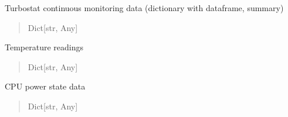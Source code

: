 \documentclass[letterpaper,10pt,english]{sphinxmanual}
\begin{document}
\begin{fulllineitems}
\begin{fulllineitems}
\begin{quote}
\begin{description}
\end{description}\end{quote}

\end{fulllineitems}


\begin{fulllineitems}
\label{\detokenize{core.models.raw_energy_measurement:core.models.raw_energy_measurement.RawEnergyMeasurement.turbostat}}
\pysigstartsignatures
\pysigline
{}
\pysigstopsignatures
\sphinxAtStartPar
Turbostat continuous monitoring data (dictionary with dataframe, summary)
\begin{quote}\begin{description}
\sphinxAtStartPar
Dict{[}str, Any{]}

\end{description}\end{quote}

\end{fulllineitems}


\begin{fulllineitems}
\label{\detokenize{core.models.raw_energy_measurement:core.models.raw_energy_measurement.RawEnergyMeasurement.thermal}}
\pysigstartsignatures
\pysigline
{}
\pysigstopsignatures
\sphinxAtStartPar
Temperature readings
\begin{quote}\begin{description}
\sphinxAtStartPar
Dict{[}str, Any{]}

\end{description}\end{quote}

\end{fulllineitems}


\begin{fulllineitems}
\label{\detokenize{core.models.raw_energy_measurement:core.models.raw_energy_measurement.RawEnergyMeasurement.power_state}}
\pysigstartsignatures
\pysigline
{}
\pysigstopsignatures
\sphinxAtStartPar
CPU power state data
\begin{quote}\begin{description}
\sphinxAtStartPar
Dict{[}str, Any{]}


\end{description}
\end{quote}
\end{fulllineitems}
\end{fulllineitems}
\end{document}

